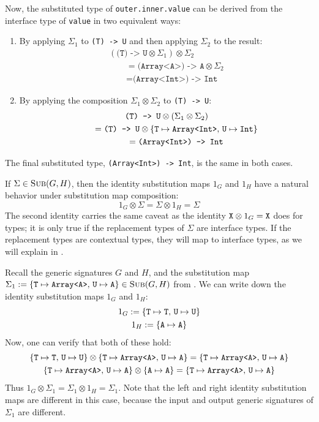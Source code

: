 \documentclass[../generics]{subfiles}
\begin{document}
\begin{example}
Now, the substituted type of \texttt{outer.inner.value} can be derived from the interface type of \texttt{value} in two equivalent ways:
\begin{enumerate}
\item By applying $\Sigma_1$ to \verb|(T) -> U| and then applying $\Sigma_2$ to the result:
\begin{gather*}
(\texttt{(T) -> U}\otimes\Sigma_1)\otimes \Sigma_2\\
\qquad {} = \texttt{(Array<A>) -> A}\otimes \Sigma_2\\
\qquad {} = \texttt{(Array<Int>) -> Int}
\end{gather*}
\item By applying the composition $\Sigma_1\otimes\Sigma_2$ to \texttt{(T) -> U}:
\begin{gather*}
\texttt{(T) -> U}\otimes(\Sigma_1\otimes \Sigma_2)\\
\qquad {} = \texttt{(T) -> U}\otimes \{ \texttt{T} \mapsto \texttt{Array<Int>},\,\texttt{U} \mapsto \texttt{Int} \}\\
\qquad {} = \texttt{(Array<Int>) -> Int}
\end{gather*}
\end{enumerate}
The final substituted type, \texttt{(Array<Int>) -> Int}, is the same in both cases.
\end{example}
If $\Sigma\in\textsc{Sub}({G, H})$, then the identity substitution maps $1_G$ and $1_H$ have a natural behavior under substitution map composition:
\[1_G\otimes\Sigma = \Sigma\otimes 1_H = \Sigma\]
The second identity carries the same caveat as the identity $\texttt{X}\otimes 1_G=\texttt{X}$ does for types; it is only true if the replacement types of $\Sigma$ are interface types. If the replacement types are contextual types, they will map to interface types, as we will explain in .
\begin{example}
Recall the generic signatures $G$ and $H$, and the substitution map $\Sigma_1 := \{ \texttt{T} \mapsto \texttt{Array<A>},\,\texttt{U} \mapsto \texttt{A} \}\in\textsc{Sub}({G, H})$ from . We can write down the identity substitution maps $1_G$ and $1_H$:
\begin{gather*}
1_G := \{\texttt{T} \mapsto \texttt{T},\,\texttt{U} \mapsto \texttt{U}\}\\
1_H := \{\texttt{A} \mapsto \texttt{A}\}
\end{gather*}
Now, one can verify that both of these hold:
\begin{gather*}
\{\texttt{T} \mapsto \texttt{T},\,\texttt{U} \mapsto \texttt{U}\}\otimes\{ \texttt{T} \mapsto \texttt{Array<A>},\,\texttt{U} \mapsto \texttt{A} \}=\{ \texttt{T} \mapsto \texttt{Array<A>},\,\texttt{U} \mapsto \texttt{A} \}\\
\{ \texttt{T} \mapsto \texttt{Array<A>},\,\texttt{U} \mapsto \texttt{A} \}\otimes\{\texttt{A} \mapsto \texttt{A}\}=\{ \texttt{T} \mapsto \texttt{Array<A>},\,\texttt{U} \mapsto \texttt{A} \}
\end{gather*}
Thus $1_G\otimes\Sigma_1 = \Sigma_1\otimes 1_H=\Sigma_1$. Note that the left and right identity substitution maps are different in this case, because the input and output generic signatures of $\Sigma_1$ are different.
\end{example}
\end{document}
